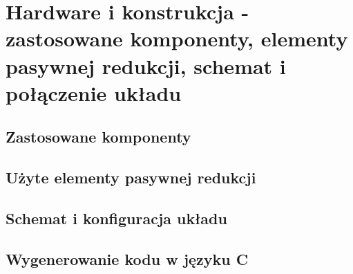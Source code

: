 \chapter{Hardware i konstrukcja - zastosowane komponenty, elementy pasywnej redukcji, schemat i połączenie układu}
\label{cha:hardware}

\section{Zastosowane komponenty}
\label{sec:komponenty}

\section{Użyte elementy pasywnej redukcji}
\label{sec:usedPNC}

\section{Schemat i konfiguracja układu}
\label{sec:config}

\section{Wygenerowanie kodu w języku C}
\label{sec:configGenerate}
